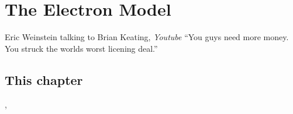 \documentclass[../rzero]{subfiles}
\begin{document}
\chapter{The Electron Model}\label{electronModelChapter}

\begin{chapquote}{Eric Weinstein talking to Brian Keating, \textit{Youtube\cite{drbriankeatingEricWeinsteinTheoretical2020}}}
``You guys need more money. You struck the worlds worst licening deal.''
\end{chapquote}


\section{This chapter}
\cite{hestenesZitterbewegungStructureElectrons2020}, \cite{Burinskii2008}
\end{document}
